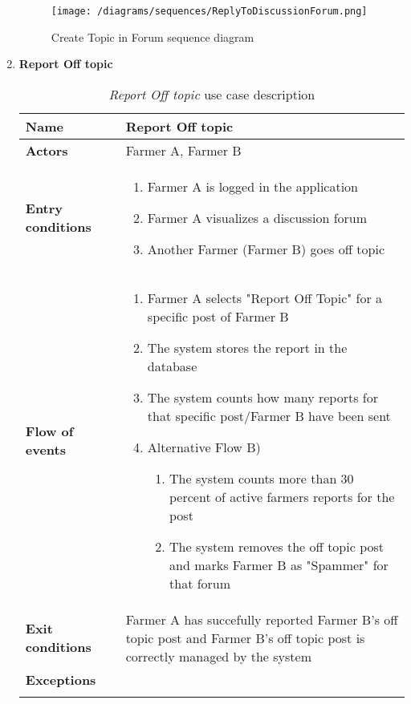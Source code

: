\begin{enumerate}
				\begin{figure}[hbtp]
					\centering
					\texttt{[image: /diagrams/sequences/ReplyToDiscussionForum.png]}
					\caption{Create Topic in Forum sequence diagram}
				\end{figure}
			
				\FloatBarrier
			
			\item \textbf{Report Off topic}
				\begin{longtable}{p{0.26\linewidth}p{0.75\linewidth}}
					\toprule
					\textbf{Name} & \textbf{Report Off topic} \\
					\midrule
					\textbf{Actors} & Farmer A, Farmer B \\
					\midrule
					\textbf{Entry conditions} & \begin{enumerate}
													\item Farmer A is logged in the application
													\item Farmer A visualizes a discussion forum
													\item Another Farmer (Farmer B) goes off topic
												\end{enumerate} \\
					\midrule
					\textbf{Flow of events} & 
					\begin{enumerate}
						\item Farmer A selects "Report Off Topic" for a specific post of Farmer B
						\item The system stores the report in the database
						\item The system counts how many reports for that specific post/Farmer B have been sent
						\item Alternative Flow B)
						\begin{enumerate}
							\item The system counts more than 30 percent of active farmers reports for the post
							\item The system removes the off topic post and marks Farmer B as "Spammer" for that forum
						\end{enumerate}
					\end{enumerate} \\
					\midrule
					\textbf{Exit conditions} & Farmer A has succefully reported Farmer B's off topic post and Farmer B's off topic post is correctly managed by the system \\
					\midrule
					\textbf{Exceptions} &  \\
					\bottomrule
					\caption{\emph{Report Off topic} use case description}
				\end{longtable}
			

\end{enumerate}
